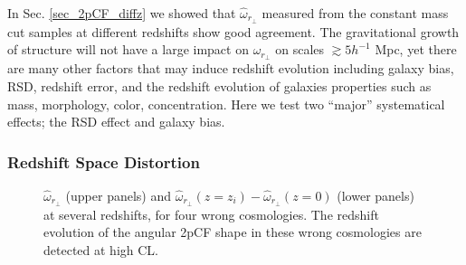 \documentclass[iop]{emulateapj}
\begin{document}
In Sec. \ref{sec_2pCF_diffz} we showed that $\hat \omega_{r_\perp}$ measured from the
constant mass cut samples at different redshifts show good agreement.
The gravitational growth of structure will not have a large impact on $\hat \omega_{r_\perp}$ on scales $\gtrsim5 h^{-1}$ Mpc,
yet there are many other factors that may induce redshift evolution
including galaxy bias, RSD, redshift error, and 
the redshift evolution of galaxies properties 
such as mass, morphology, color, concentration. 
Here we test two ``major'' systematical effects;  the RSD effect and galaxy bias.



\subsubsection{Redshift Space Distortion}


\begin{figure}
   \caption{\label{fig_cosmo}
    $\hat{\omega}_{r_\perp}$ (upper panels) and $\hat{\omega}_{r_\perp}(z=z_i) - \hat{\omega}_{r_\perp}(z=0)$ (lower panels) at several redshifts,
    for four wrong cosmologies.
    The redshift evolution of the angular 2pCF shape in these wrong cosmologies are detected at high CL.
   }
\end{figure}
\end{document}
